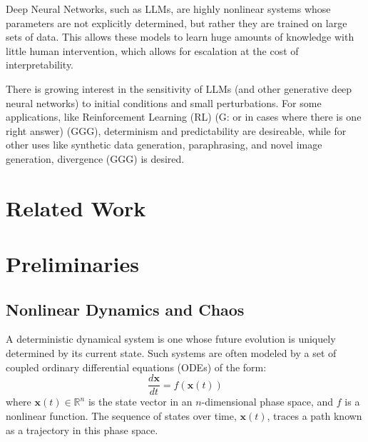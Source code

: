 \documentclass[a4paper,12pt]{article}
\begin{document}
Deep Neural Networks, such as LLMs, are highly nonlinear systems whose parameters are not explicitly determined, but rather they are trained on large sets of data. This allows these models to learn huge amounts of knowledge with little human intervention, which allows for escalation at the cost of interpretability.

There is growing interest in the sensitivity of LLMs (and other generative deep neural networks) to initial conditions and small perturbations. For some applications, like Reinforcement Learning (RL) (G: or in cases where there is one right answer) (GGG), determinism and predictability are desireable, while for other uses like synthetic data generation, paraphrasing, and novel image generation, divergence (GGG) is desired.

\section{Related Work}


\section{Preliminaries}


\subsection{Nonlinear Dynamics and Chaos}
A deterministic dynamical system is one whose future evolution is uniquely determined by its current state. Such systems are often modeled by a set of coupled ordinary differential equations (ODEs) of the form:
\begin{equation}
    \frac{d\mathbf{x}}{dt} = f(\mathbf{x}(t))
\end{equation}
where $\mathbf{x}(t) \in \mathbb{R}^n$ is the state vector in an $n$-dimensional phase space, and $f$ is a nonlinear function. The sequence of states over time, $\mathbf{x}(t)$, traces a path known as a trajectory in this phase space.
\end{document}
